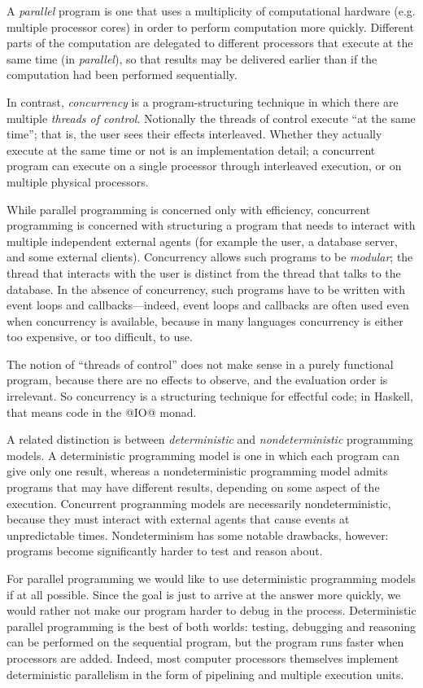 \documentclass{llncs}
\begin{document}
A \emph{parallel} program is one that uses a multiplicity of
computational hardware (e.g. multiple processor cores) in order to
perform computation more quickly.  Different parts of the computation
are delegated to different processors that execute at the same time
(in \emph{parallel}), so that results may be delivered earlier than if
the computation had been performed sequentially.

In contrast, \emph{concurrency} is a program-structuring technique in
which there are multiple \emph{threads of control}.  Notionally the
threads of control execute ``at the same time''; that is, the user
sees their effects interleaved.  Whether they actually execute at the
same time or not is an implementation detail; a concurrent program can
execute on a single processor through interleaved execution, or on
multiple physical processors.

While parallel programming is concerned only with efficiency,
concurrent programming is concerned with structuring a program that
needs to interact with multiple independent external agents (for
example the user, a database server, and some external clients).
Concurrency allows such programs to be \emph{modular}; the thread that
interacts with the user is distinct from the thread that talks to the
database.  In the absence of concurrency, such programs have to be
written with event loops and callbacks---indeed, event loops and
callbacks are often used even when concurrency is available, because
in many languages concurrency is either too expensive, or too
difficult, to use.

The notion of ``threads of control'' does not make sense in a purely
functional program, because there are no effects to observe, and the
evaluation order is irrelevant.  So concurrency is a structuring
technique for effectful code; in Haskell, that means code in the @IO@
monad.

A related distinction is between \emph{deterministic} and
\emph{nondeterministic} programming models.  A deterministic
programming model is one in which each program can give only one
result, whereas a nondeterministic programming model admits programs
that may have different results, depending on some aspect of the
execution.  Concurrent programming models are necessarily
nondeterministic, because they must interact with external agents that
cause events at unpredictable times.  Nondeterminism has some notable
drawbacks, however: programs become significantly harder to test and
reason about.

For parallel programming we would like to use deterministic
programming models if at all possible.  Since the goal is just to
arrive at the answer more quickly, we would rather not make our
program harder to debug in the process.  Deterministic parallel
programming is the best of both worlds: testing, debugging and
reasoning can be performed on the sequential program, but the program
runs faster when processors are added.  Indeed, most computer
processors themselves implement deterministic parallelism in the form
of pipelining and multiple execution units.
\end{document}

